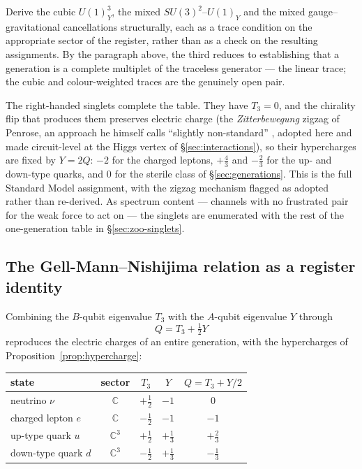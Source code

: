 \begin{openproblem}\label{op:anomalies}
Derive the cubic $U(1)_Y^3$, the mixed $SU(3)^2$--$U(1)_Y$ and the mixed gauge--gravitational
cancellations structurally, each as a trace condition on the appropriate sector of the register,
rather than as a check on the resulting assignments. By the paragraph above, the third reduces to
establishing that a generation is a complete multiplet of the traceless generator --- the linear
trace; the cubic and colour-weighted traces are the genuinely open pair.
\end{openproblem}

The right-handed singlets complete the table.\label{sec:rh-singlets} They have $T_3 = 0$, and the
chirality flip that produces them preserves electric charge (the \emph{Zitterbewegung} zigzag of Penrose, an
approach he himself calls ``slightly non-standard'' \autocite[628--632]{Penrose1994}, adopted here
and made circuit-level at the Higgs vertex of \S\ref{sec:interactions}), so their
hypercharges are fixed by $Y = 2Q$: $-2$ for the charged leptons, $+\tfrac43$ and $-\tfrac23$ for
the up- and down-type quarks, and $0$ for the sterile class of \S\ref{sec:generations}. This is the
full Standard Model assignment, with the zigzag mechanism flagged as adopted rather than
re-derived. As spectrum content --- channels with no frustrated pair for the weak force to act on
--- the singlets are enumerated with the rest of the one-generation table in
\S\ref{sec:zoo-singlets}.

\subsection{The Gell-Mann--Nishijima relation as a register identity}

Combining the $B$-qubit eigenvalue $T_3$ with the $A$-qubit eigenvalue $Y$ through
\begin{equation}
  Q = T_3 + \tfrac12 Y
\end{equation}
reproduces the electric charges of an entire generation, with the hypercharges of
Proposition~\ref{prop:hypercharge}:

\begin{center}
\begin{tabular}{lcccc}
\hline
state & sector & $T_3$ & $Y$ & $Q = T_3 + Y/2$ \\
\hline
neutrino $\nu$        & $\mathbb{C}$   & $+\tfrac12$ & $-1$          & $0$ \\
charged lepton $e$    & $\mathbb{C}$   & $-\tfrac12$ & $-1$          & $-1$ \\
up-type quark $u$     & $\mathbb{C}^3$ & $+\tfrac12$ & $+\tfrac13$   & $+\tfrac23$ \\
down-type quark $d$   & $\mathbb{C}^3$ & $-\tfrac12$ & $+\tfrac13$   & $-\tfrac13$ \\
\hline
\end{tabular}
\end{center}

